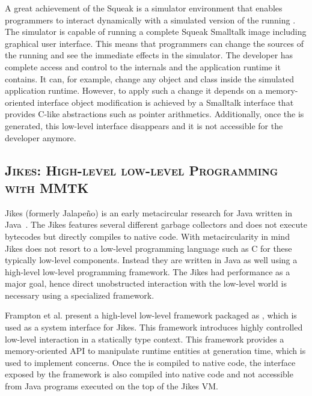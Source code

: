 A great achievement of the Squeak \VM is a simulator environment that enables programmers to interact dynamically with a simulated version of the running \VM.
The simulator is capable of running a complete Squeak Smalltalk image including graphical user interface.
This means that programmers can change the sources of the running \VM and see the immediate effects in the simulator.
The \VM developer has complete access and control to the \VM internals and the application runtime it contains. It can, for example, change any object and class inside the simulated application runtime. However, to apply such a change it depends on a memory-oriented interface \ie object modification is achieved by a Smalltalk interface that provides C-like abstractions such as pointer arithmetics. Additionally, once the \VM is generated, this low-level interface disappears and it is not accessible for the developer anymore.

\subsection*{\textsc{Jikes: High-level low-level Programming with MMTK}}
Jikes (formerly Jalapeño) is an early metacircular research \VM for Java written in Java~\cite{Alpe00a}.
The Jikes \VM features several different garbage collectors and does not execute bytecodes but directly compiles to native code.
With metacircularity in mind Jikes does not resort to a low-level programming language such as C for these typically low-level \VM components.
Instead they are written in Java as well using a high-level low-level programming framework.
The Jikes \VM had performance as a major goal, hence direct unobstructed interaction with the low-level world is necessary using a specialized framework.

Frampton et al. present a high-level low-level framework packaged as , which is used as a system interface for Jikes. This framework introduces highly controlled low-level interaction in a statically type context. This framework provides a memory-oriented API to manipulate runtime entities at \VM generation time, which is used to implement \VM concerns. Once the \VM is compiled to native code, the interface exposed by the  framework is also compiled into native code and not accessible from Java programs executed on the top of the Jikes VM.


